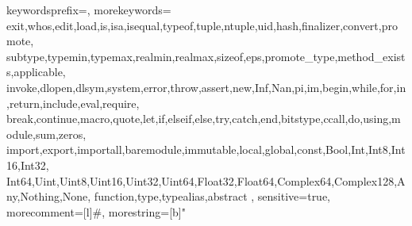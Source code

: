 
\usepackage{listings}
\usepackage[usenames,dvipsnames]{color} %
\usepackage{inconsolata}



{
  keywordsprefix=\@,
  morekeywords={
    exit,whos,edit,load,is,isa,isequal,typeof,tuple,ntuple,uid,hash,finalizer,convert,promote,
    subtype,typemin,typemax,realmin,realmax,sizeof,eps,promote_type,method_exists,applicable,
    invoke,dlopen,dlsym,system,error,throw,assert,new,Inf,Nan,pi,im,begin,while,for,in,return,include,eval,require,
    break,continue,macro,quote,let,if,elseif,else,try,catch,end,bitstype,ccall,do,using,module,sum,zeros,
    import,export,importall,baremodule,immutable,local,global,const,Bool,Int,Int8,Int16,Int32,
    Int64,Uint,Uint8,Uint16,Uint32,Uint64,Float32,Float64,Complex64,Complex128,Any,Nothing,None,
    function,type,typealias,abstract
  },
  sensitive=true,
  morecomment=[l]{\#},
  morestring=[b]" 
}
